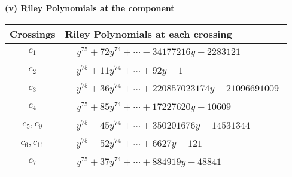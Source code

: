 \documentclass[1p]{elsarticle_modified}
\theoremstyle{definition}
\begin{document}
\newpage\renewcommand{\arraystretch}{1}
\flushleft \textbf{(v) Riley Polynomials at the component}\newline \\
\begin{tabular}{m{50pt}|m{274pt}}
Crossings & \hspace{64pt}Riley Polynomials at each crossing \\
\hline $$\begin{aligned}c_{1}\end{aligned}$$&$\begin{aligned}
&y^{75}+72 y^{74}+\cdots-34177216 y-2283121
\end{aligned}$\\
\hline $$\begin{aligned}c_{2}\end{aligned}$$&$\begin{aligned}
&y^{75}+11 y^{74}+\cdots+92 y-1
\end{aligned}$\\
\hline $$\begin{aligned}c_{3}\end{aligned}$$&$\begin{aligned}
&y^{75}+36 y^{74}+\cdots+220857023174 y-21096691009
\end{aligned}$\\
\hline $$\begin{aligned}c_{4}\end{aligned}$$&$\begin{aligned}
&y^{75}+85 y^{74}+\cdots+17227620 y-10609
\end{aligned}$\\
\hline $$\begin{aligned}c_{5},c_{9}\end{aligned}$$&$\begin{aligned}
&y^{75}-45 y^{74}+\cdots+350201676 y-14531344
\end{aligned}$\\
\hline $$\begin{aligned}c_{6},c_{11}\end{aligned}$$&$\begin{aligned}
&y^{75}-52 y^{74}+\cdots+6627 y-121
\end{aligned}$\\
\hline $$\begin{aligned}c_{7}\end{aligned}$$&$\begin{aligned}
&y^{75}+37 y^{74}+\cdots+884919 y-48841
\end{aligned}$\\

\end{tabular}
\end{document}
